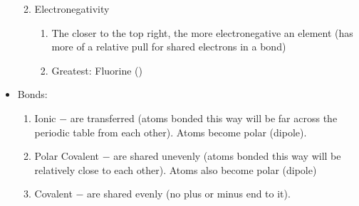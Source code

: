 \documentclass[12pt]{article}
\begin{document}
\begin{itemize}
\begin{enumerate}
\begin{enumerate}
        \end{enumerate}

      \item Electronegativity

        \begin{enumerate}

          \item The closer to the top right, the more electronegative an element (has more of a relative pull for shared electrons in a bond)

          \item Greatest: Fluorine () 

        \end{enumerate}

    \end{enumerate}

  \item Bonds:

    \begin{enumerate}

      \item Ionic $-$  are transferred (atoms bonded this way will be far across the periodic table from each other). Atoms become polar (dipole).

      \item Polar Covalent $-$  are shared unevenly (atoms bonded this way will be relatively close to each other). Atoms also become polar (dipole)

      \item Covalent $-$  are shared evenly (no plus or minus end to it).

    \end{enumerate}

\end{itemize}
\end{document}
